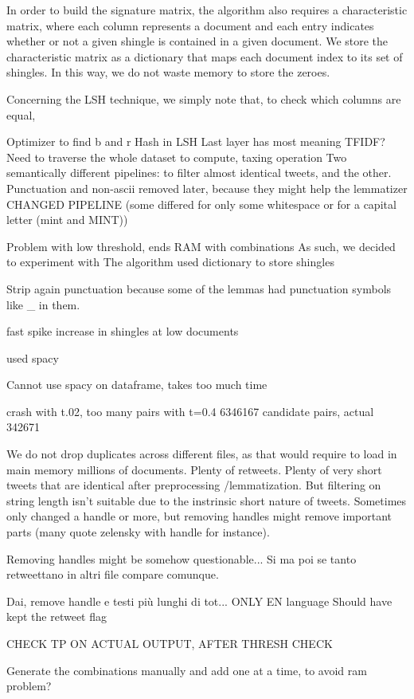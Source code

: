 \documentclass[runningheads]{llncs}
\begin{document}
In order to build the signature matrix, the algorithm also requires a characteristic matrix, where each column represents a document and each entry indicates whether or not a given shingle is contained in a given document. We store the characteristic matrix as a dictionary that maps each document index to its set of shingles. In this way, we do not waste memory to store the zeroes.

Concerning the LSH technique, we simply note that, to check which columns are equal, 

Optimizer to find b and r
Hash in LSH
Last layer has most meaning
TFIDF? Need to traverse the whole dataset to compute, taxing operation
Two semantically different pipelines: to filter almost identical tweets, and the other.
Punctuation and non-ascii removed later, because they might help the lemmatizer
CHANGED PIPELINE (some differed for only some whitespace or for a capital letter (mint and MINT))

Problem with low threshold, ends RAM with combinations
As such, we decided to experiment with   
The algorithm 
used dictionary to store shingles 

Strip again punctuation because some of the lemmas had punctuation symbols like \_ in them.

fast spike increase in shingles at low documents

used spacy 

Cannot use spacy on dataframe, takes too much time

crash with t.02, too many pairs
with t=0.4 6346167 candidate pairs, actual 342671 

We do not drop duplicates across different files, as that would require to load in main memory millions of documents. Plenty of retweets. Plenty of very short tweets that are identical after preprocessing /lemmatization. But filtering on string length isn't suitable due to the instrinsic short nature of tweets.  
Sometimes only changed a handle or more, but removing handles might remove important parts (many quote zelensky with handle for instance).

Removing handles might be somehow questionable... Si ma poi se tanto retweettano in altri file compare comunque.

Dai, remove handle e testi più lunghi di tot...
ONLY EN language
Should have kept the retweet flag


CHECK TP ON ACTUAL OUTPUT, AFTER THRESH CHECK

Generate the combinations manually and add one at a time, to avoid ram problem?
\end{document}
